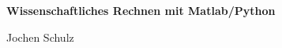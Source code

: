 \documentclass[a4paper,10pt,DIV15]{scrartcl}
\begin{document}
\begin{center}
\textbf{\LARGE Wissenschaftliches Rechnen mit Matlab/Python}\\
\end{center}
\begin{minipage}{6cm}
Jochen Schulz
\end{minipage}\hfill
\end{document}
